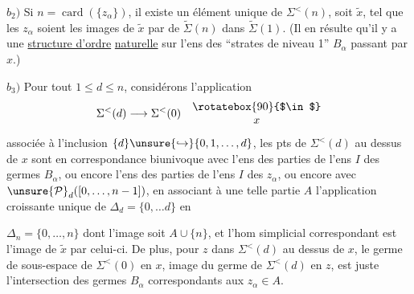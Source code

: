 $b_2)$  Si $n=\operatorname{card}(\{z_\alpha\})$, il existe un élément  unique de $\Sigma^{<}(n)$, soit $\widetilde{x}$, tel que les  $z_\alpha$ soient les images de $\widetilde{x}$ par  de $\widetilde\Sigma(n)$ dans $\widetilde\Sigma(1)$.
(Il en résulte qu'il y a une \uline{structure d'ordre}  \uline{naturelle} sur l'ens des ``strates de niveau 1'' $B_\alpha$  passant par $x$.)

 $b_3)$ Pour tout  $1\leq d\leq n$, considérons l'application
\[
\Sigma^{<}(d)\longrightarrow\Sigma^{<}(0)\quad\begin{matrix}\rotatebox{90}{$\in$}\\x\end{matrix}
\]
 associée à l'inclusion  $\{d\}\unsure{\hookrightarrow}\{0,1,\ldots,d\}$, les pts  de $\Sigma^{<}(d)$ au dessus de $x$ sont en correspondance biunivoque avec l'ens des parties  de l'ens \deleted{$\unsure{\Sigma}$} $I$ des germes $B_\alpha$, ou encore l'ens des parties  de l'ens $I$ des $z_\alpha$, ou encore avec $\unsure{\mathcal P}_d([0,\ldots,n-1])$, en associant à une telle partie $A$ l'application  croissante unique de $\Delta_d=\{0,\ldots d\}$ en

$\Delta_n=\{0,\ldots,n\}$ dont l'image soit $A\cup\{n\}$, et l'hom simplicial correspondant
est l'image de $\widetilde x$ par celui-ci. De plus, pour $z$ dans  $\Sigma^{<}(d)$ au dessus de $x$,  le germe de sous-espace de $\Sigma^{<}(0)$ en $x$, image du germe de $\Sigma^{<}(d)$ en $z$, est juste l'intersection des germes $B_\alpha$ correspondants aux $z_\alpha\in A$.

